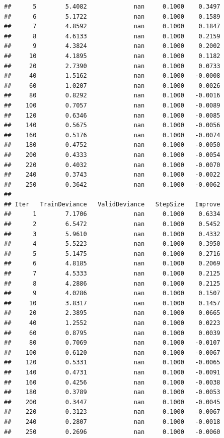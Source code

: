 \documentclass[]{book}
\begin{document}
\begin{verbatim}
##      5        5.4082             nan     0.1000    0.3497
##      6        5.1722             nan     0.1000    0.1589
##      7        4.8592             nan     0.1000    0.1847
##      8        4.6133             nan     0.1000    0.2159
##      9        4.3824             nan     0.1000    0.2002
##     10        4.1895             nan     0.1000    0.1182
##     20        2.7390             nan     0.1000    0.0733
##     40        1.5162             nan     0.1000   -0.0008
##     60        1.0207             nan     0.1000    0.0026
##     80        0.8292             nan     0.1000   -0.0016
##    100        0.7057             nan     0.1000   -0.0089
##    120        0.6346             nan     0.1000   -0.0085
##    140        0.5675             nan     0.1000   -0.0056
##    160        0.5176             nan     0.1000   -0.0074
##    180        0.4752             nan     0.1000   -0.0050
##    200        0.4333             nan     0.1000   -0.0054
##    220        0.4032             nan     0.1000   -0.0070
##    240        0.3743             nan     0.1000   -0.0022
##    250        0.3642             nan     0.1000   -0.0062
## 
## Iter   TrainDeviance   ValidDeviance   StepSize   Improve
##      1        7.1706             nan     0.1000    0.6334
##      2        6.5472             nan     0.1000    0.5452
##      3        5.9610             nan     0.1000    0.4332
##      4        5.5223             nan     0.1000    0.3950
##      5        5.1475             nan     0.1000    0.2716
##      6        4.8185             nan     0.1000    0.2069
##      7        4.5333             nan     0.1000    0.2125
##      8        4.2886             nan     0.1000    0.2125
##      9        4.0286             nan     0.1000    0.1507
##     10        3.8317             nan     0.1000    0.1457
##     20        2.3895             nan     0.1000    0.0665
##     40        1.2552             nan     0.1000    0.0223
##     60        0.8795             nan     0.1000    0.0039
##     80        0.7069             nan     0.1000   -0.0107
##    100        0.6120             nan     0.1000   -0.0067
##    120        0.5331             nan     0.1000   -0.0065
##    140        0.4731             nan     0.1000   -0.0091
##    160        0.4256             nan     0.1000   -0.0038
##    180        0.3789             nan     0.1000   -0.0053
##    200        0.3447             nan     0.1000   -0.0045
##    220        0.3123             nan     0.1000   -0.0067
##    240        0.2807             nan     0.1000   -0.0018
##    250        0.2696             nan     0.1000   -0.0060

\end{verbatim}
\end{document}
